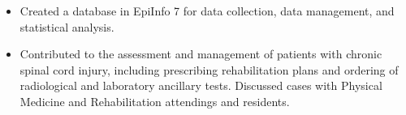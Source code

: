 \begin{cventries}
{\begin{cvitems}
\begin{itemize}
      \item {Created a database in EpiInfo 7 for data collection, data management, and statistical analysis.}
      \item {Contributed to the assessment and management of patients with chronic spinal cord injury, including prescribing rehabilitation plans and ordering of radiological and laboratory ancillary tests. Discussed cases with Physical Medicine and Rehabilitation attendings and residents.}
    \end{itemize}
  \end{cvitems}
  }
  \vspace{5pt}
 




\end{cventries}

